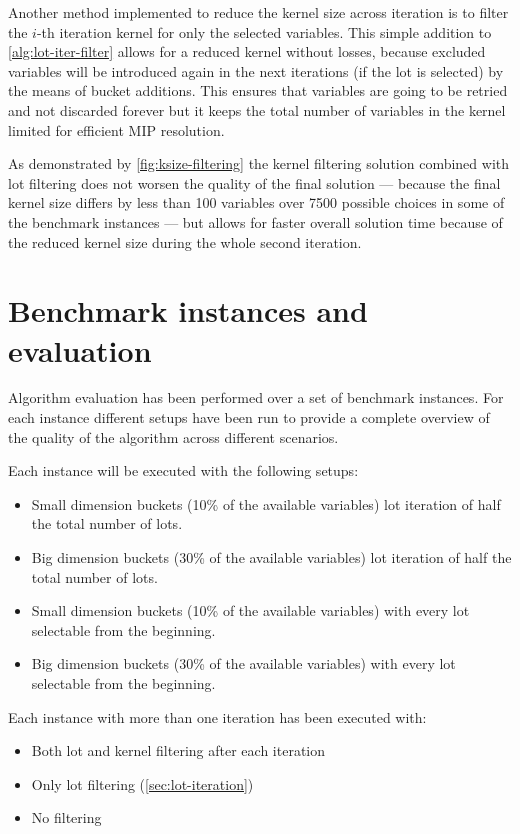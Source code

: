 \documentclass[a4paper, twocolumn, oneside, 10pt]{article}
\begin{document}
Another method implemented to reduce the kernel size across iteration is to filter the \(i\)-th iteration kernel for only the selected variables. This simple addition to \cref{alg:lot-iter-filter} allows for a reduced kernel without losses, because excluded variables will be introduced again in the next iterations (if the lot is selected) by the means of bucket additions. This ensures that variables are going to be retried and not discarded forever but it keeps the total number of variables in the kernel limited for efficient \ac{MIP} resolution.

As demonstrated by \cref{fig:ksize-filtering} the kernel filtering solution combined with lot filtering does not worsen the quality of the final solution --- because the final kernel size differs by less than 100 variables over 7500 possible choices in some of the benchmark instances --- but allows for faster overall solution time because of the reduced kernel size during the whole second iteration. 

\section{Benchmark instances and evaluation}\label{sec:benchmark}

Algorithm evaluation has been performed over a set of benchmark instances. For each instance different setups have been run to provide a complete overview of the quality of the algorithm across different scenarios.

Each instance will be executed with the following setups:
\begin{itemize}
	\item Small dimension buckets (10\% of the available variables) lot iteration of half the total number of lots. 
	\item Big dimension buckets (30\% of the available variables) lot iteration of half the total number of lots.
	\item Small dimension buckets (10\% of the available variables) with every lot selectable from the beginning.
	\item Big dimension buckets (30\% of the available variables) with every lot selectable from the beginning.
\end{itemize}

Each instance with more than one iteration has been executed with:
\begin{itemize}
	\item Both lot and kernel filtering after each iteration
	\item Only lot filtering (\cref{sec:lot-iteration})
	\item No filtering
\end{itemize}
\end{document}
